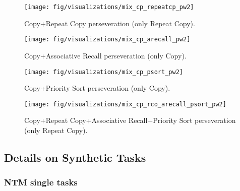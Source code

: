 \documentclass[english]{article}
\begin{document}
\begin{figure}[H]
\begin{centering}
\texttt{[image: fig/visualizations/mix\_cp\_repeatcp\_pw2]}
\par\end{centering}
\caption{Copy+Repeat Copy perseveration (only Repeat Copy).}
\end{figure}
\begin{figure}[H]
\begin{centering}
\texttt{[image: fig/visualizations/mix\_cp\_arecall\_pw2]}
\par\end{centering}
\caption{Copy+Associative Recall perseveration (only Copy).}
\end{figure}
\begin{figure}[H]
\begin{centering}
\texttt{[image: fig/visualizations/mix\_cp\_psort\_pw2]}
\par\end{centering}
\caption{Copy+Priority Sort perseveration (only Copy).}
\end{figure}
\begin{figure}[H]
\begin{centering}
\texttt{[image: fig/visualizations/mix\_cp\_rco\_arecall\_psort\_pw2]}
\par\end{centering}
\caption{Copy+Repeat Copy+Associative Recall+Priority Sort perseveration (only
Repeat Copy).}
\end{figure}

\subsection{Details on Synthetic Tasks\label{subsec:Details-on-Synthetic}}

\subsubsection{NTM single tasks}
\end{document}
